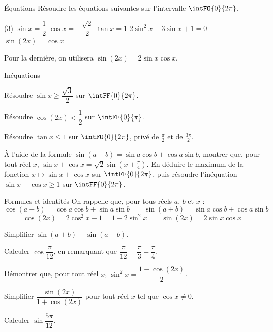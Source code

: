 \begin{exercice}[2]{Équations}
Résoudre les équations suivantes sur l'intervalle $\intFO{0}{2\pi}$.
\begin{tasks}(3)
  \task $\sin x=\dfrac12$
  \task $\cos x=-\dfrac{\sqrt2}{2}$
  \task $\tan x=1$
  \task $2\sin^{2}x-3\sin x+1=0$
  \task $\sin(2x)=\cos x$
\end{tasks}
Pour la dernière, on utilisera $\sin(2x)=2\sin x\cos x$.
\end{exercice}

\begin{exercice}[2]{Inéquations}
\begin{questions}
  \item Résoudre $\sin x\geq\dfrac{\sqrt3}{2}$ sur $\intFF{0}{2\pi}$.
  \item Résoudre $\cos(2x)<\dfrac12$ sur $\intFF{0}{\pi}$.
  \item Résoudre $\tan x\leq1$ sur $\intFO{0}{2\pi}$, privé de $\frac{\pi}{2}$ et de $\frac{3\pi}{2}$.
  \item À l'aide de la formule $\sin(a+b)=\sin a\cos b+\cos a\sin b$, montrer que, pour tout réel $x$,
    $\sin x+\cos x=\sqrt2\sin\left(x+\frac{\pi}{4}\right)$. En déduire le maximum de la fonction $x\mapsto\sin x+\cos x$
    sur $\intFF{0}{2\pi}$, puis résoudre l'inéquation $\sin x+\cos x\geq1$ sur $\intFF{0}{2\pi}$.
\end{questions}
\end{exercice}

\begin{exercice}[2]{Formules et identités}
On rappelle que, pour tous réels $a$, $b$ et $x$ :
\[ \cos(a-b)=\cos a\cos b+\sin a\sin b \qquad \sin(a\pm b)=\sin a\cos b\pm\cos a\sin b \]
\[ \cos(2x)=2\cos^{2}x-1=1-2\sin^{2}x \qquad \sin(2x)=2\sin x\cos x \]
\begin{questions}
  \item Simplifier $\sin(a+b)+\sin(a-b)$.
  \item Calculer $\cos\dfrac{\pi}{12}$, en remarquant que $\dfrac{\pi}{12}=\dfrac{\pi}{3}-\dfrac{\pi}{4}$.
  \item Démontrer que, pour tout réel $x$, $\sin^{2}x=\dfrac{1-\cos(2x)}{2}$.
  \item Simplifier $\dfrac{\sin(2x)}{1+\cos(2x)}$ pour tout réel $x$ tel que $\cos x\neq0$.
  \item Calculer $\sin\dfrac{5\pi}{12}$.
\end{questions}
\end{exercice}

